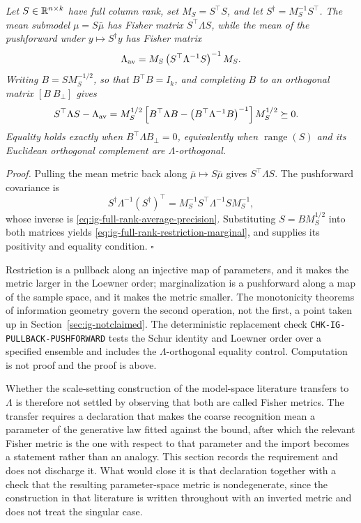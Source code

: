 \medskip
{}
\emph{Let $S\in\mathbb R^{n\times k}$ have full column rank, set
$M_S=S^\top S$, and let
$S^\dagger=M_S^{-1}S^\top$. The mean submodel
$\mu=S\bar\mu$ has Fisher matrix $S^\top\Lambda S$, while the mean of
the pushforward under $y\mapsto S^\dagger y$ has Fisher matrix}
\begin{equation}
\Lambda_{\rm av}
=M_S\left(S^\top\Lambda^{-1}S\right)^{-1}M_S.
\label{eq:ig-full-rank-average-precision}
\end{equation}
\emph{Writing $B=SM_S^{-1/2}$, so that $B^\top B=I_k$, and completing
$B$ to an orthogonal matrix $[B\ B_\perp]$ gives}
\begin{equation}
\begin{aligned}
S^\top\Lambda S-\Lambda_{\rm av}
&=M_S^{1/2}\left[
B^\top\Lambda B-\left(B^\top\Lambda^{-1}B\right)^{-1}
\right]M_S^{1/2}\succeq0.
\end{aligned}
\label{eq:ig-full-rank-restriction-marginal}
\end{equation}
\emph{Equality holds exactly when
$B^\top\Lambda B_\perp=0$, equivalently when
$\operatorname{range}(S)$ and its Euclidean orthogonal complement are
$\Lambda$-orthogonal.} 

\noindent\emph{Proof.} Pulling the mean metric back along
$\bar\mu\mapsto S\bar\mu$ gives $S^\top\Lambda S$. The pushforward
covariance is
\[
S^\dagger\Lambda^{-1}(S^\dagger)^\top
=M_S^{-1}S^\top\Lambda^{-1}SM_S^{-1},
\]
whose inverse is \eqref{eq:ig-full-rank-average-precision}. Substituting
$S=BM_S^{1/2}$ into both matrices yields
\eqref{eq:ig-full-rank-restriction-marginal}, and
 supplies its positivity and equality
condition. \hfill$\square$

\medskip
Restriction is a pullback along an injective map of parameters, and it makes the metric larger in the Loewner order; marginalization is a pushforward along a map of the sample space, and it makes the metric smaller. The monotonicity theorems of information geometry govern the second operation, not the first, a point taken up in Section~\ref{sec:ig-notclaimed}. The deterministic replacement check \texttt{CHK-IG-PULLBACK-PUSHFORWARD} tests the Schur identity and Loewner order over a specified ensemble and includes the $\Lambda$-orthogonal equality control. Computation is not proof and the proof is above. 

Whether the scale-setting construction of the model-space literature transfers to $\Lambda$ is therefore not settled by observing that both are called Fisher metrics. The transfer requires a declaration that makes the coarse recognition mean a parameter of the generative law fitted against the bound, after which the relevant Fisher metric is the one with respect to that parameter and the import becomes a statement rather than an analogy. This section records the requirement and does not discharge it. What would close it is that declaration together with a check that the resulting parameter-space metric is nondegenerate, since the construction in that literature is written throughout with an inverted metric and does not treat the singular case. 

